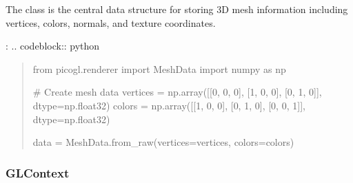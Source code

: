 \documentclass[a4paper,10pt,english,openany,oneside]{sphinxmanual}
\begin{document}
\sphinxAtStartPar
The  class is the central data structure for storing 3D mesh information including vertices, colors, normals, and texture coordinates.

\sphinxAtStartPar
{}:
.. code\sphinxhyphen{}block:: python
\begin{quote}

\sphinxAtStartPar
from picogl.renderer import MeshData
import numpy as np

\sphinxAtStartPar
\# Create mesh data
vertices = np.array({[}{[}0, 0, 0{]}, {[}1, 0, 0{]}, {[}0, 1, 0{]}{]}, dtype=np.float32)
colors = np.array({[}{[}1, 0, 0{]}, {[}0, 1, 0{]}, {[}0, 0, 1{]}{]}, dtype=np.float32)

\sphinxAtStartPar
data = MeshData.from\_raw(vertices=vertices, colors=colors)
\end{quote}


\subsubsection{GLContext}
\label{\detokenize{api/renderer:glcontext}}
\end{document}
